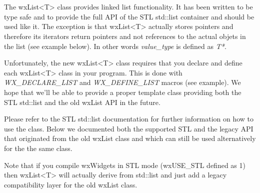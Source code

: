 
\section{}\label{wxlist}

The wxList<T> class provides linked list functionality. It has been written
to be type safe and to provide the full API of the STL std::list container and
should be used like it. The exception is that wxList<T> actually stores
pointers and therefore its iterators return pointers and not references
to the actual objets in the list (see example below). In other words
{\it value\_type} is defined as {\it T*}.


Unfortunately, the
new wxList<T> class requires that you declare and define each wxList<T>
class in your program. This is done with {\it WX\_DECLARE\_LIST} and 
{\it WX\_DEFINE\_LIST} macros (see example). We hope that we'll be able
to provide a proper template class providing both the STL std::list
and the old wxList API in the future.

Please refer to the STL std::list documentation for further
information on how to use the class. Below we documented both
the supported STL and the legacy API that originated from the 
old wxList class and which can still be used alternatively for
the the same class.

Note that if you compile wxWidgets in STL mode (wxUSE\_STL defined as 1) 
then wxList<T> will actually derive from std::list and just add a legacy 
compatibility layer for the old wxList class.


